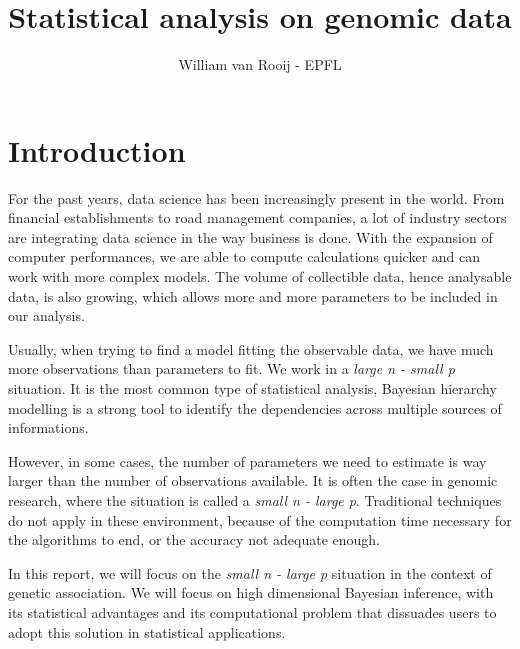 \documentclass{article}
\numberwithin{equation}{section}
\begin{document}
\title{Statistical analysis on genomic data}
\author{William van Rooij - EPFL}

\maketitle

\newpage
\tableofcontents
\newpage
\section{Introduction}
For the past years, data science has been increasingly present in the world. From financial establishments to road management companies, a lot of industry sectors are integrating data science in the way business is done. With the expansion of computer performances, we are able to compute calculations quicker and can work with more complex models. The volume of collectible data, hence analysable data, is also growing, which allows more and more parameters to be included in our analysis.

Usually, when trying to find a model fitting the observable data, we have much more observations than parameters to fit. We work in a \textit{large n - small p} situation. It is the most common type of statistical analysis, Bayesian hierarchy modelling is a strong tool to identify the dependencies across multiple sources of informations.

However, in some cases, the number of parameters we need to estimate is way larger than the number of observations available. It is often the case in genomic research, where the situation is called a \textit{small n - large p}. Traditional techniques do not apply in these environment, because of the computation time necessary for the algorithms to end, or the accuracy not adequate enough.

In this report, we will focus on the \textit{small n - large p} situation in the context of genetic association. We will focus on high dimensional Bayesian inference, with its statistical advantages and its computational problem that dissuades users to adopt this solution in statistical applications.
\end{document}
